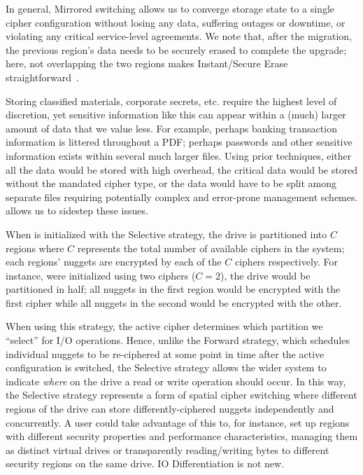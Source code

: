 In general, Mirrored switching allows us to converge storage state to a single
cipher configuration without losing any data, suffering outages or downtime, or
violating any critical service-level agreements. We note that, after the
migration, the previous region's data needs to be securely erased to complete
the upgrade; here, not overlapping the two regions makes Instant/Secure Erase
straightforward~\cite{ISE1,ISE2}.



 Storing classified materials, corporate secrets,
etc. require the highest level of discretion, yet sensitive information like
this can appear within a (much) larger amount of data that we value less. For
example, perhaps banking transaction information is littered throughout a PDF;
perhaps passwords and other sensitive information exists within several much
larger files. Using prior techniques, either all the data would be stored with
high overhead, the critical data would be stored without the mandated cipher
type, or the data would have to be split among separate files requiring
potentially complex and error-prone management schemes. \sys allows us to
sidestep these issues.

When \sys is initialized with the Selective strategy, the drive is partitioned
into $C$ regions where $C$ represents the total number of available ciphers in
the system; each regions' nuggets are encrypted by each of the $C$ ciphers
respectively. For instance, were \sys initialized using two ciphers ($C = 2$),
the drive would be partitioned in half; all nuggets in the first region would be
encrypted with the first cipher while all nuggets in the second would be
encrypted with the other.

When using this strategy, the active cipher determines which partition we
``select'' for I/O operations. Hence, unlike the Forward strategy, which
schedules individual nuggets to be re-ciphered at some point in time after the
active configuration is switched, the Selective strategy allows the wider system
to indicate \emph{where} on the drive a read or write operation should occur. In
this way, the Selective strategy represents a form of spatial cipher switching
where different regions of the drive can store differently-ciphered nuggets
independently and concurrently. A user could take advantage of this to, for
instance, set up regions with different security properties and performance
characteristics, managing them as distinct virtual drives or transparently
reading/writing bytes to different security regions on the same drive. IO
Differentiation is not new.

